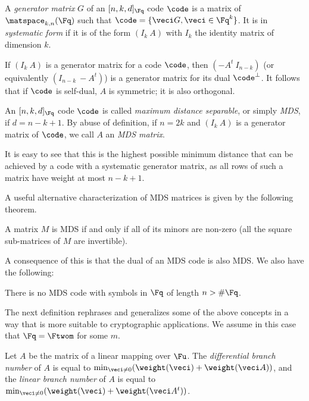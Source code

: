 \begin{defi}
A \emph{generator matrix} $G$ of an $[n, k, d]_{\Fq}$ code $\code$ is a matrix of $\matspace_{k,n}(\Fq)$ such that
$\code = \{\veci G, \veci \in \Fq^k\}$. It is in \emph{systematic form} if it is of the form $(I_k~A)$ with
$I_k$ the identity matrix of dimension $k$. 
\end{defi}

If $(I_k~A)$ is a generator matrix for a code $\code$, then $(-A^t~I_{n-k})$ (or equivalently $(I_{n-k}~-A^t)$)
is a generator matrix for its dual $\code^\bot$. It follows that if $\code$ is self-dual, $A$ is symmetric; it is
also orthogonal.

\begin{defi}
An $[n,k,d]_{\Fq}$ code $\code$ is called \emph{maximum distance separable}, or simply \emph{MDS}, if $d = n - k + 1$.
By abuse of definition, if $n = 2k$ and $(I_k~A)$ is a generator matrix of $\code$, we call $A$ an \emph{MDS matrix}.
\end{defi}

It is easy to see that this is the highest possible minimum distance that can be achieved by a code with a
systematic generator matrix, as all rows of such a matrix have weight at most $n - k + 1$.

A useful alternative characterization of MDS matrices is given by the following theorem.

\begin{thm}
\label{thm:mds_minors}
A matrix $M$ is MDS if and only if all of its minors are non-zero (\ie all the square sub-matrices of $M$ are invertible).
\end{thm}

A consequence of this is that the dual of an MDS code is also MDS.
We also have the following:

\begin{conj}
There is no MDS code with symbols in $\Fq$ of length $n > \#\Fq$.
\end{conj}

The next definition rephrases and generalizes some of the above concepts in a way that is more suitable to cryptographic applications.
We assume in this case that $\Fq = \Ftwom$ for some $m$.

\begin{defi}
Let $A$ be the matrix of a linear mapping over $\Fu$.
The \emph{differential branch number} of $A$
is equal to $\min_{\veci \neq 0}(\weight(\veci) + \weight(\veci A))$,
and the \emph{linear branch number} of $A$ is equal to $\min_{\veci \neq 0}(\weight(\veci) + \weight(\veci A^t))$.
\end{defi}

